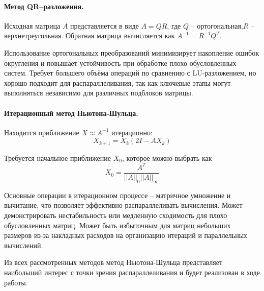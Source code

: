 \documentclass[12pt]{article}
\begin{document}
	\paragraph{Метод QR--разложения.} Исходная матрица \(A\) представляется в виде \(A=QR\), где \(Q\) -- ортогональная,\(R\) -- верхнетреугольная. Обратная матрица вычисляется как \(A^{-1}=R^{-1}Q^T\).
	\par Использование ортогональных преобразований минимизирует накопление ошибок округления и повышает устойчивость при обработке плохо обусловленных систем. Требует большего объёма операций по сравнению с LU-разложением, но хорошо подходит для распараллеливания, так как ключевые этапы могут выполняться независимо для различных подблоков матрицы.
	
	\paragraph{Итерационный метод Ньютона-Шульца.} Находится приближение \(X \approx A^{-1}\) итерационно: \[X_{k+1}=X_k(2I-AX_k)\] 
	\par Требуется начальное приближение \(X_0\), которое можно выбрать как \[X_0=\frac{A^T}{||A||_0||A||_\infty}\]
	\par Основные операции в итерационном процессе -- матричное умножение и вычитание, что позволяет эффективно распараллеливать вычисления. Может демонстрировать нестабильность или медленную сходимость для плохо обусловленных матриц. Может быть избыточным для матриц небольших размеров из-за накладных расходов на организацию итераций и параллельных вычислений.
	\par Из всех рассмотренных методов метод Ньютона-Шульца представляет наибольший интерес с точки зрения распараллеливания и будет реализован в ходе работы.
	
\end{document}
